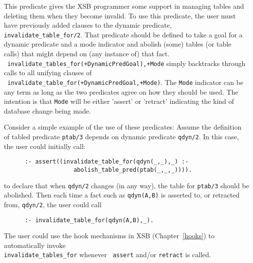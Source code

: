 \begin{description}
\begin{description}
This predicate gives the XSB programmer some support in managing
tables and deleting them when they become invalid.  To use this
predicate, the user must have previously added clauses to the dynamic
predicate, {\tt invalidate\_table\_for/2}.  That predicate should be
defined to take a goal for a dynamic predicate and a mode indicator
and abolish (some) tables (or table calls) that might depend on (any
instance of) that fact.  \\ {\tt
invalidate\_tables\_for(+DynamicPredGoal),+Mode} simply backtracks
through calls to all unifying clauses of \\ {\tt
invalidate\_table\_for(+DynamicPredGoal,+Mode)}.  The {\tt Mode}
indicator can be any term as long as the two predicates agree on how
they should be used.  The intention is that {\tt Mode} will be either
'assert' or 'retract' indicating the kind of database change being
made.

Consider a simple example of the use of these predicates: Assume the
definition of tabled predicate {\tt ptab/3} depends on dynamic predicate
{\tt qdyn/2}.  In this case, the user could initially call:
\begin{verbatim}
      :- assert((invalidate_table_for(qdyn(_,_),_) :-
                    abolish_table_pred(ptab(_,_,_)))).
\end{verbatim}
to declare that when {\tt qdyn/2} changes (in any way), the table for {\tt ptab/3}
should be abolished.  Then each time a fact such as {\tt qdyn(A,B)} is
asserted to, or retracted from, {\tt qdyn/2}, the user could call
\begin{verbatim}
      :- invalidate_table_for(qdyn(A,B),_).
\end{verbatim}

The user could use the hook mechanisms in XSB (Chapter~\ref{hooks}) to
automatically invoke \\ {\tt invalidate\_tables\_for} whenever {\tt
  assert} and/or {\tt retract} is called.

\end{description}




\comment{


%

}
\end{description}
